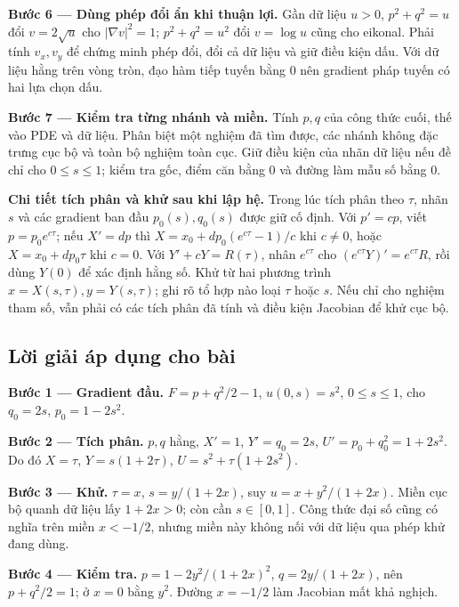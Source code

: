 \documentclass[10pt,a4paper]{article}
\begin{document}
\textbf{Bước 6 — Dùng phép đổi ẩn khi thuận lợi.} Gần dữ liệu $u>0$, $p^2+q^2=u$ đổi $v=2\sqrt u$ cho $|\nabla v|^2=1$; $p^2+q^2=u^2$ đổi $v=\log u$ cũng cho eikonal. Phải tính $v_x,v_y$ để chứng minh phép đổi, đổi cả dữ liệu và giữ điều kiện dấu. Với dữ liệu hằng trên vòng tròn, đạo hàm tiếp tuyến bằng 0 nên gradient pháp tuyến có hai lựa chọn dấu.

\textbf{Bước 7 — Kiểm tra từng nhánh và miền.} Tính $p,q$ của công thức cuối, thế vào PDE và dữ liệu. Phân biệt một nghiệm đã tìm được, các nhánh không đặc trưng cục bộ và toàn bộ nghiệm toàn cục. Giữ điều kiện của nhãn dữ liệu nếu đề chỉ cho $0\le s\le1$; kiểm tra gốc, điểm căn bằng 0 và đường làm mẫu số bằng 0.

\textbf{Chi tiết tích phân và khử sau khi lập hệ.} Trong lúc tích phân theo $\tau$, nhãn $s$ và các gradient ban đầu $p_0(s),q_0(s)$ được giữ cố định. Với $p'=cp$, viết $p=p_0e^{c\tau}$; nếu $X'=dp$ thì $X=x_0+dp_0(e^{c\tau}-1)/c$ khi $c\ne0$, hoặc $X=x_0+dp_0\tau$ khi $c=0$. Với $Y'+cY=R(\tau)$, nhân $e^{c\tau}$ cho $(e^{c\tau}Y)'=e^{c\tau}R$, rồi dùng $Y(0)$ để xác định hằng số. Khử từ hai phương trình $x=X(s,\tau),y=Y(s,\tau)$; ghi rõ tổ hợp nào loại $\tau$ hoặc $s$. Nếu chỉ cho nghiệm tham số, vẫn phải có các tích phân đã tính và điều kiện Jacobian để khử cục bộ.
\subsection*{Lời giải áp dụng cho bài}
\textbf{Bước 1 — Gradient đầu.} $F=p+q^2/2-1$, $u(0,s)=s^2$, $0\le s\le1$, cho $q_0=2s$, $p_0=1-2s^2$.

\textbf{Bước 2 — Tích phân.} $p,q$ hằng, $X'=1$, $Y'=q_0=2s$, $U'=p_0+q_0^2=1+2s^2$. Do đó $X=\tau$, $Y=s(1+2\tau)$, $U=s^2+\tau(1+2s^2)$.

\textbf{Bước 3 — Khử.} $\tau=x$, $s=y/(1+2x)$, suy $u=x+y^2/(1+2x)$. Miền cục bộ quanh dữ liệu lấy $1+2x>0$; còn cần $s\in[0,1]$. Công thức đại số cũng có nghĩa trên miền $x<-1/2$, nhưng miền này không nối với dữ liệu qua phép khử đang dùng.

\textbf{Bước 4 — Kiểm tra.} $p=1-2y^2/(1+2x)^2$, $q=2y/(1+2x)$, nên $p+q^2/2=1$; ở $x=0$ bằng $y^2$. Đường $x=-1/2$ làm Jacobian mất khả nghịch.
\end{document}
